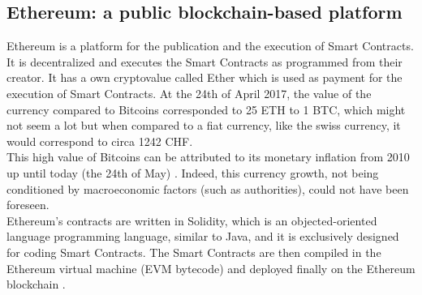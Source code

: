 \subsection{Ethereum: a public blockchain-based platform}
Ethereum is a platform for the publication and the execution of Smart Contracts. It is decentralized \cite{paper2} and executes the Smart Contracts as programmed from their creator.
It has a own cryptovalue called Ether which is used as payment for the execution of Smart Contracts.
At the 24th of April 2017, the value of the currency compared to Bitcoins corresponded to 25 ETH to 1 BTC, which might not seem a lot but when compared to a fiat currency, like the swiss currency, it would correspond to circa 1242 CHF.\\
This high value of Bitcoins can be attributed to its monetary inflation from 2010 up until today (the 24th of May) \cite{BitcoinsPriceCharts}. Indeed, this currency growth, not being conditioned by macroeconomic factors (such as authorities), could not have been foreseen. \\
Ethereum's contracts are written in Solidity, which is an objected-oriented language programming language, similar to Java, and it is exclusively designed for coding Smart Contracts.
The Smart Contracts are then compiled in the Ethereum virtual machine (EVM bytecode) and deployed finally on the Ethereum blockchain \cite{paper2}. 

